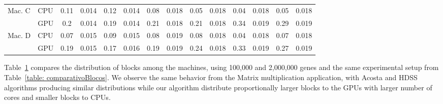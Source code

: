 \documentclass[journal]{IEEEtran}
\begin{document}
\begin{table}[htb]
\begin{scriptsize}
\begin{tabular}{|l|l|l|l|l|l|l|l|l|l|l|l|l|l|}
\hline
Mac. C & CPU & \multicolumn{1}{c|}{0.11} & \multicolumn{1}{c|}{0.014} & \multicolumn{1}{c|}{0.12} & \multicolumn{1}{c|}{0.014} & \multicolumn{1}{c|}{0.08} & \multicolumn{1}{c|}{0.018} & \multicolumn{1}{c|}{0.05} & \multicolumn{1}{c|}{0.018} & \multicolumn{1}{c|}{0.04} & \multicolumn{1}{c|}{0.018} & \multicolumn{1}{c|}{0.05} & \multicolumn{1}{c|}{0.018} \\ 
\cline{2-14}
 & GPU & \multicolumn{1}{c|}{0.2} & \multicolumn{1}{c|}{0.014} & \multicolumn{1}{c|}{0.19} & \multicolumn{1}{c|}{0.014} & \multicolumn{1}{c|}{0.21} & \multicolumn{1}{c|}{0.018} & \multicolumn{1}{c|}{0.21} & \multicolumn{1}{c|}{0.018} & \multicolumn{1}{c|}{0.34} & \multicolumn{1}{c|}{0.019} & \multicolumn{1}{c|}{0.29} & \multicolumn{1}{c|}{0.019} \\ 
\hline
Mac. D & CPU & \multicolumn{1}{c|}{0.07} & \multicolumn{1}{c|}{0.015} & \multicolumn{1}{c|}{0.09} & \multicolumn{1}{c|}{0.015} & \multicolumn{1}{c|}{0.08} & \multicolumn{1}{c|}{0.019} & \multicolumn{1}{c|}{0.08} & \multicolumn{1}{c|}{0.018} & \multicolumn{1}{c|}{0.04} & \multicolumn{1}{c|}{0.018} & \multicolumn{1}{c|}{0.07} & \multicolumn{1}{c|}{0.018} \\ 
\cline{2-14}
 & GPU & \multicolumn{1}{c|}{0.19} & \multicolumn{1}{c|}{0.015} & \multicolumn{1}{c|}{0.17} & \multicolumn{1}{c|}{0.016} & \multicolumn{1}{c|}{0.19} & \multicolumn{1}{c|}{0.019} & \multicolumn{1}{c|}{0.24} & \multicolumn{1}{c|}{0.018} & \multicolumn{1}{c|}{0.33} & \multicolumn{1}{c|}{0.019} & \multicolumn{1}{c|}{0.27} & \multicolumn{1}{c|}{0.019} \\ 
\hline
\end{tabular}
\end{scriptsize}
\label{table: comparativoGene}
\end{table}

Table~\ref{table: comparativoGene} compares the distribution of blocks among the
machines, using 100,000 and 2,000,000 genes and the same experimental setup from
Table~\ref{table: comparativoBlocos}. We observe the same behavior from the
Matrix multiplication application, with Acosta and HDSS algorithms producing
similar distributions while our algorithm distribute proportionally larger
blocks to the GPUs with larger number of cores and smaller blocks to CPUs.
\end{document}
